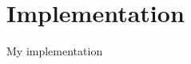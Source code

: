 \documentclass{standalone}
\begin{document}
	\section{Implementation}
		My implementation
\end{document}
